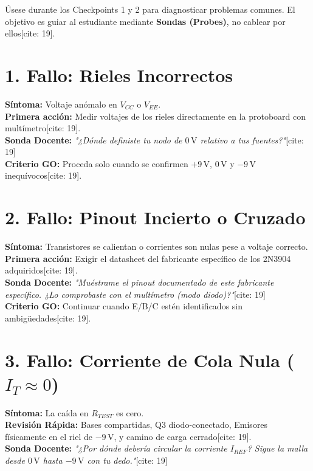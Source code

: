\documentclass[11pt, a4paper]{article}
\begin{document}
\begin{tcolorbox}[colback=red!5, colframe=red!70!black, title=\textbf{Instructor Troubleshooting Decision Tree[cite: 19]}]
    Úsese durante los Checkpoints 1 y 2 para diagnosticar problemas comunes. El objetivo es guiar al estudiante mediante \textbf{Sondas (Probes)}, no cablear por ellos[cite: 19].
\end{tcolorbox}

\section*{1. Fallo: Rieles Incorrectos}
\textbf{Síntoma:} Voltaje anómalo en $V_{CC}$ o $V_{EE}$. \\
\textbf{Primera acción:} Medir voltajes de los rieles directamente en la protoboard con multímetro[cite: 19]. \\
\textbf{Sonda Docente:} \textit{"¿Dónde definiste tu nodo de $0\,\text{V}$ relativo a tus fuentes?"}[cite: 19] \\
\textbf{Criterio GO:} Proceda solo cuando se confirmen $+9\,\text{V}$, $0\,\text{V}$ y $-9\,\text{V}$ inequívocos[cite: 19].

\section*{2. Fallo: Pinout Incierto o Cruzado}
\textbf{Síntoma:} Transistores se calientan o corrientes son nulas pese a voltaje correcto. \\
\textbf{Primera acción:} Exigir el datasheet del fabricante específico de los 2N3904 adquiridos[cite: 19]. \\
\textbf{Sonda Docente:} \textit{"Muéstrame el pinout documentado de este fabricante específico. ¿Lo comprobaste con el multímetro (modo diodo)?"}[cite: 19] \\
\textbf{Criterio GO:} Continuar cuando E/B/C estén identificados sin ambigüedades[cite: 19].

\section*{3. Fallo: Corriente de Cola Nula ($I_T \approx 0$)}
\textbf{Síntoma:} La caída en $R_{TEST}$ es cero. \\
\textbf{Revisión Rápida:} Bases compartidas, Q3 diodo-conectado, Emisores físicamente en el riel de $-9\,\text{V}$, y camino de carga cerrado[cite: 19]. \\
\textbf{Sonda Docente:} \textit{"¿Por dónde debería circular la corriente $I_{REF}$? Sigue la malla desde $0\,\text{V}$ hasta $-9\,\text{V}$ con tu dedo."}[cite: 19]
\end{document}
